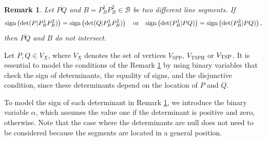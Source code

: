 \documentclass[a4paper,  review, authoryear, 1p., doubleblind]{elsarticle}
\newcommand{\VSPP}{{V_{\text{SPP}}}}
\newcommand{\VTSPH}{{V_{\text{TSPH}}}}
\newtheorem{remark}{Remark}
\newcommand{\determinant}[3]{\det({#1|#2#3})}
\begin{document}
	
	\begin{remark}\label{rem:determinants}
		Let $\overline{PQ}$ and $B=\overline{P_B^1P_B^2}\in\mathcal B$ be two different line segments. 
		If
		\begin{equation*}
			\normalfont{\text{sign}}\left(\determinant{P}{P_B^1}{P_B^2}\right) = \normalfont{\text{sign}}\left(\determinant{Q}{P_B^1}{P_B^2}\right)
			\quad
			\text{or}
			\quad
			\normalfont{\text{sign}}\left(\determinant{P_B^1}{P}{Q}\right) = \normalfont{\text{sign}}\left(\determinant{P_B^2}{P}{Q}\right)
			,
		\end{equation*}
		then $\overline{PQ}$ and $B$ do not intersect.
	\end{remark}
	
	
	
	
	Let $P,Q\in V_X$, where $V_X$ denotes the set of vertices $\VSPP$, $\VTSPH$ or $V_{\rm{TSP}}$. It is essential to model the conditions of the Remark \ref{rem:determinants} by using binary variables that check the sign of determinants, the equality of signs, and the disjunctive condition, since these determinants depend on the location of $P$ and $Q$.
	
	\newcommand{\LS}[3]{L(#1|#2#3)}
	\newcommand{\US}[3]{U(#1|#2#3)}
	\newcommand{\alphamas}[3]{\alpha(#1|#2#3)}
	\newcommand{\alphamenos}[3]{\alpha^{-}(#1|#2#3)}
	\newcommand{\alphapunto}[3]{\alpha^{\cdotp}(#1|#2#3)}
	
	To model the sign of each determinant in Remark \ref{rem:determinants}, we introduce the binary variable $\alpha$, which assumes the value one if the determinant is positive and zero, otherwise. Note that the case where the determinants are null does not need to be considered because the segments are located in a general position.
	
\end{document}
